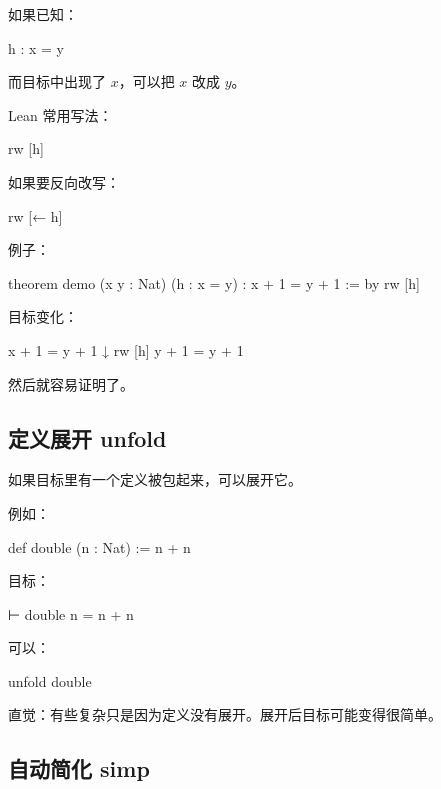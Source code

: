 \documentclass[UTF8,12pt]{ctexart}
\begin{document}
如果已知：

\begin{LeanCode}
h : x = y
\end{LeanCode}

而目标中出现了 \(x\)，可以把 \(x\) 改成 \(y\)。

Lean 常用写法：

\begin{LeanCode}
rw [h]
\end{LeanCode}

如果要反向改写：

\begin{LeanCode}
rw [← h]
\end{LeanCode}

例子：

\begin{LeanCode}
theorem demo
  (x y : Nat)
  (h : x = y) :
  x + 1 = y + 1 := by
  rw [h]
\end{LeanCode}

目标变化：

\begin{Tree}
x + 1 = y + 1
↓ rw [h]
y + 1 = y + 1
\end{Tree}

然后就容易证明了。

\subsection{定义展开 unfold}

如果目标里有一个定义被包起来，可以展开它。

例如：

\begin{LeanCode}
def double (n : Nat) := n + n
\end{LeanCode}

目标：

\begin{LeanCode}
⊢ double n = n + n
\end{LeanCode}

可以：

\begin{LeanCode}
unfold double
\end{LeanCode}

直觉：有些复杂只是因为定义没有展开。展开后目标可能变得很简单。

\subsection{自动简化 simp}
\end{document}
